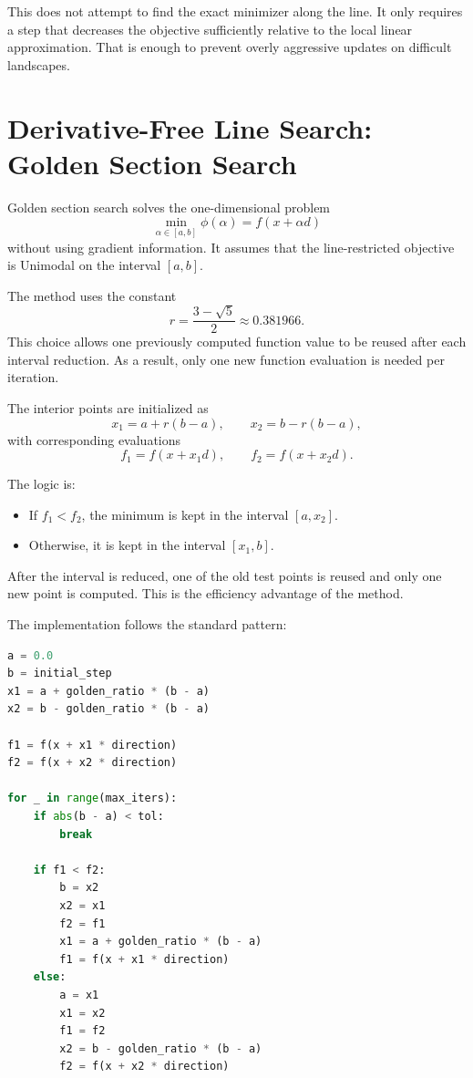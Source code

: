 \documentclass[12pt,a4paper]{report}
\begin{document}
This does not attempt to find the exact minimizer along the line. It only requires a step that decreases the objective sufficiently relative to the local linear approximation. That is enough to prevent overly aggressive updates on difficult landscapes.

\section{Derivative-Free Line Search: Golden Section Search}

Golden section search solves the one-dimensional problem
\begin{equation}
\min_{\alpha \in [a,b]} \phi(\alpha) = f(x + \alpha d)
\end{equation}
without using gradient information. It assumes that the line-restricted objective is \gls{Unimodal} on the interval $[a,b]$.

The method uses the constant
\begin{equation}
r = \frac{3 - \sqrt{5}}{2} \approx 0.381966.
\end{equation}
This choice allows one previously computed function value to be reused after each interval reduction. As a result, only one new function evaluation is needed per iteration.

The interior points are initialized as
\begin{equation}
x_1 = a + r(b-a), \qquad x_2 = b - r(b-a),
\end{equation}
with corresponding evaluations
\begin{equation}
f_1 = f(x + x_1 d), \qquad f_2 = f(x + x_2 d).
\end{equation}

The logic is:
\begin{itemize}
    \item If $f_1 < f_2$, the minimum is kept in the interval $[a, x_2]$.
    \item Otherwise, it is kept in the interval $[x_1, b]$.
\end{itemize}
After the interval is reduced, one of the old test points is reused and only one new point is computed. This is the efficiency advantage of the method.

The implementation follows the standard pattern:
\begin{lstlisting}[language=Python]
a = 0.0
b = initial_step
x1 = a + golden_ratio * (b - a)
x2 = b - golden_ratio * (b - a)

f1 = f(x + x1 * direction)
f2 = f(x + x2 * direction)

for _ in range(max_iters):
    if abs(b - a) < tol:
        break

    if f1 < f2:
        b = x2
        x2 = x1
        f2 = f1
        x1 = a + golden_ratio * (b - a)
        f1 = f(x + x1 * direction)
    else:
        a = x1
        x1 = x2
        f1 = f2
        x2 = b - golden_ratio * (b - a)
        f2 = f(x + x2 * direction)
\end{lstlisting}
\end{document}
